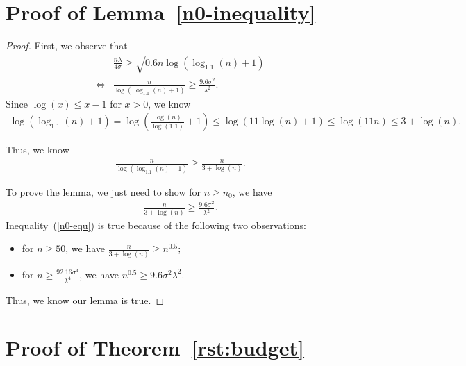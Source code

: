 \section*{Proof of Lemma~\ref{n0-inequality}}

\begin{proof}
First, we observe that
\begin{align}
&\frac{n\lambda}{4\sigma}\geq \sqrt{0.6n\log(\log_{1.1}(n)+1)} \nonumber \\
\iff &\frac{n}{\log(\log_{1.1}(n)+1)}\geq \frac{9.6\sigma^2}{\lambda^2}. \nonumber 
\end{align}
Since $\log(x)\leq x-1$ for $x>0$, we know 
\begin{align}
\log(\log_{1.1}(n)+1)=\log\left(\frac{\log(n)}{\log(1.1)}+1\right)\leq \log(11\log(n)+1)\leq \log(11n)\leq 3+\log(n). \nonumber
\end{align}

Thus, we know
\begin{align}
\frac{n}{\log(\log_{1.1}(n)+1)}\geq \frac{n}{3+\log(n)}. \nonumber 
\end{align}

To prove the lemma, we just need to show for $n\geq n_{0}$, we have
\begin{align}
\frac{n}{3+\log(n)}\geq \frac{9.6\sigma^2}{\lambda^2}. \label{n0-equ}
\end{align}
Inequality~(\ref{n0-equ}) is true because of the following two observations:
\begin{itemize}
\item for $n\geq 50$, we have $\frac{n}{3+\log(n)}\geq n^{0.5}$;
\item for $n\geq \frac{92.16\sigma^4}{\lambda^4}$, we have $n^{0.5}\geq {9.6\sigma^{2}}{\lambda^{2}}$.
\end{itemize}

Thus, we know our lemma is true.

\end{proof}




\section*{Proof of Theorem~\ref{rst:budget}}

